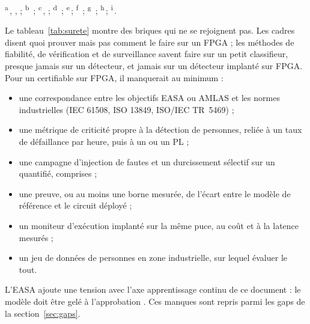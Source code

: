 \begin{table}[!htbp]
\smallskip\raggedright\footnotesize
\textsuperscript{a}\,\citet{2020-easa-concepts-design-assurance-neural-networks},
\citet{2024-easa-concepts-design-assurance-neural-networks},
\citet{2024-easa-concept-paper-guidance-level-1} ;
\textsuperscript{b}\,\citet{arxiv-2406.12362-certified-ml-object-detection-surveillance} ;
\textsuperscript{c}\,\citet{2019-libano-selective-hardening-neural-networks-fpgas},
\citet{2020-libano-understanding-impact-quantization-accuracy-radiation} ;
\textsuperscript{d}\,\citet{2024-rech-artificial-neural-networks-space-safety} ;
\textsuperscript{e}\,\citet{arxiv-1709.06662-verifying-properties-binarized-deep-neural}\pp ;
\textsuperscript{f}\,\citet{arxiv-2012.08185-scalable-verification-quantized-neural-networks} ;
\textsuperscript{g}\,\citet{arxiv-2011.10671-review-comparative-probabilistic-object-detection} ;
\textsuperscript{h}\,\citet{arxiv-2304.06052-confident-object-detection-conformal-prediction}\pp ;
\textsuperscript{i}\,\citet{arxiv-1904.08653-fooling-automated-surveillance-cameras-adversarial}\pp.
\end{table}

Le tableau~\ref{tab:surete} montre des briques qui ne se rejoignent pas. Les cadres
disent quoi prouver mais pas comment le faire sur un FPGA ; les méthodes de fiabilité,
de vérification et de surveillance savent faire sur un petit classifieur, presque jamais
sur un détecteur, et jamais sur un détecteur implanté sur FPGA. Pour un  certifiable
sur FPGA, il manquerait au minimum \deduit :
\begin{itemize}
  \item une correspondance entre les objectifs EASA ou AMLAS et les normes industrielles
    (IEC 61508, ISO 13849, ISO/IEC TR~5469) ;
  \item une métrique de criticité propre à la détection de personnes, reliée à un taux de
    défaillance par heure, puis à un  ou un PL ;
  \item une campagne d'injection de fautes et un durcissement sélectif sur un  quantifié,
     comprises ;
  \item une preuve, ou au moins une borne mesurée, de l'écart entre le modèle de référence et
    le circuit déployé ;
  \item un moniteur d'exécution implanté sur la même puce, au coût et à la latence mesurés ;
  \item un jeu de données de personnes en zone industrielle, sur lequel évaluer le tout.
\end{itemize}
L'EASA ajoute une tension avec l'axe apprentissage continu de ce document : le modèle doit
être gelé à l'approbation \citep[MOC LM-02]{2024-easa-concept-paper-guidance-level-1}. Ces
manques sont repris parmi les gaps de la section~\ref{sec:gaps}.
